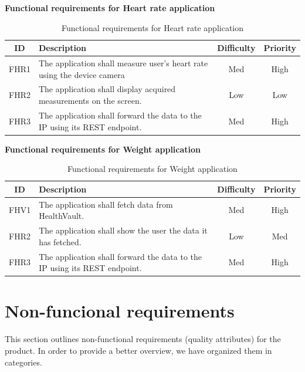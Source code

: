 \textbf{Functional requirements for Heart rate application}

\begin{table}[h]
\begin{center}
\begin{tabular}{ | c | p{9cm} | c | c |}
  \hline
  ID & Description & Difficulty & Priority\\
  \hline\noalign{\smallskip}\noalign{\smallskip}\hline
  FHR1	& The application shall measure user’s heart rate using the device camera	& Med	& High \\
  FHR2	& The application shall display acquired measurements on the screen.		& Low	& Low \\
  FHR3	& The application shall forward the data to the IP using its REST endpoint. & Med	& High \\
  \hline
\end{tabular}
\end{center}
\caption{Functional requirements for Heart rate application}
\label{table:reqfrontend}
\end{table}

\textbf{Functional requirements for Weight application}

\begin{table}[h]
\begin{center}
\begin{tabular}{ | c | p{9cm} | c | c |}
  \hline
  ID & Description & Difficulty & Priority\\
  \hline\noalign{\smallskip}\noalign{\smallskip}\hline
  FHV1	& The application shall fetch data from HealthVault.						& Med	& High \\
  FHR2	& The application shall show the user the data it has fetched.				& Low	& Med \\
  FHR3	& The application shall forward the data to the IP using its REST endpoint. & Med	& High \\
  \hline
\end{tabular}
\end{center}
\caption{Functional requirements for Weight application}
\label{table:reqfrontend}
\end{table}


\section{Non-funcional requirements}
\label{section:nonfunctionalreq}

This section outlines non-functional requirements (quality attributes) for the product.
In order to provide a better overview, we have organized them in categories.

